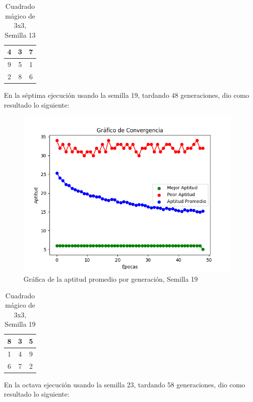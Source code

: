 \documentclass{report}
\begin{document}
    \begin{table}[H]
        \centering
        \begin{tabular}{|c|c|c|}
            \hline
            4 & 3 & 7\\
            \hline
            9 & 5 & 1\\
            \hline
            2 & 8 & 6\\
            \hline
        \end{tabular}
        \caption{Cuadrado mágico de 3x3, Semilla 13}
    \end{table}
    En la séptima ejecución usando la semilla 19, tardando 48 generaciones, dio como resultado lo siguiente:
    \begin{figure}[H]
        \centering
        \includegraphics[scale=0.5]{Grafica7.png}
        \caption{Gráfica de la aptitud promedio por generación, Semilla 19}
    \end{figure}
    \begin{table}[H]
        \centering
        \begin{tabular}{|c|c|c|}
            \hline
            8 & 3 & 5\\
            \hline
            1 & 4 & 9\\
            \hline
            6 & 7 & 2\\
            \hline
        \end{tabular}
        \caption{Cuadrado mágico de 3x3, Semilla 19}
    \end{table}
    En la octava ejecución usando la semilla 23, tardando 58 generaciones, dio como resultado lo siguiente:
\end{document}
